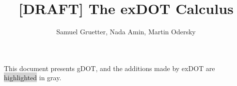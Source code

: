 \documentclass{llncs}
\begin{document}
\thispagestyle{plain}
\pagestyle{plain}
\mainmatter

\title{[DRAFT] The exDOT Calculus}
\author{Samuel Gruetter, Nada Amin, Martin Odersky}

\maketitle
\sloppy
\newcommand{\lindent}{\hspace{-4mm}}


\newcommand{\highlight}[1]{\colorbox{lightgray}{#1}}

\newcommand{\HIGHLIGHT}[1]{\colorbox{lightgray}{$#1$}}

This document presents gDOT, and the additions made by exDOT are \highlight{highlighted} in gray.
\end{document}
